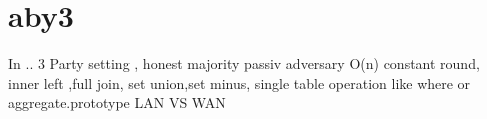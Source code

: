 \section{aby3}
In \cite{10.1145/3372297.3423358} ..
3 Party setting , honest majority passiv adversary O(n) constant round, inner left ,full join, set union,set minus, single table operation like where or aggregate.prototype LAN VS WAN
  